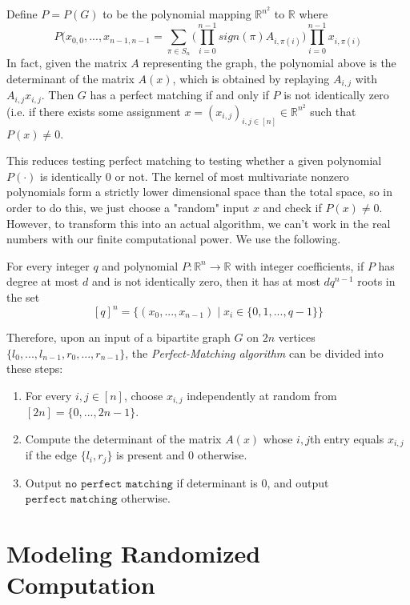 \documentclass{article}
\begin{document}
  \begin{lemma}
  Define $P = P(G)$ to be the polynomial mapping $\mathbb{R}^{n^2}$ to $\mathbb{R}$ where 
  \[P(x_{0, 0}, ..., x_{n-1, n-1} = \sum_{\pi \in S_n} \bigg( \prod_{i=0}^{n-1} sign(\pi) A_{i, \pi(i)} \bigg) \prod_{i=0}^{n-1} x_{i, \pi(i)}\]
  In fact, given the matrix $A$ representing the graph, the polynomial above is the determinant of the matrix $A(x)$, which is obtained by replaying $A_{i, j}$ with $A_{i, j} x_{i, j}$. Then $G$ has a perfect matching if and only if $P$ is not identically zero (i.e. if there exists some assignment $x = (x_{i, j})_{i, j \in [n]} \in \mathbb{R}^{n^2}$ such that $P(x) \neq 0$. 
  \end{lemma}
  This reduces testing perfect matching to testing whether a given polynomial $P(\cdot)$ is identically $0$ or not. The kernel of most multivariate nonzero polynomials form a strictly lower dimensional space than the total space, so in order to do this, we just choose a "random" input $x$ and check if $P(x) \neq 0$. However, to transform this into an actual algorithm, we can't work in the real numbers with our finite computational power. We use the following. 

  \begin{theorem}
  For every integer $q$ and polynomial $P: \mathbb{R}^n \longrightarrow \mathbb{R}$ with integer coefficients, if $P$ has degree at most $d$ and is not identically zero, then it has at most $d q^{n-1}$ roots in the set 
  \[[q]^n = \big\{(x_0, ..., x_{n-1}) \;|\; x_i \in \{0, 1, ..., q-1\}\big\}\]
  \end{theorem}

  Therefore, upon an input of a bipartite graph $G$ on $2n$ vertices $\{l_0, ..., l_{n-1}, r_0, ..., r_{n-1}\}$, the \textit{Perfect-Matching algorithm} can be divided into these steps: 
  \begin{enumerate}
      \item For every $i, j \in [n]$, choose $x_{i, j}$ independently at random from $[2n] = \{0, ..., 2n-1\}$. 
      \item Compute the determinant of the matrix $A(x)$ whose $i, j$th entry equals $x_{i, j}$ if the edge $\{l_i, r_j\}$ is present and $0$ otherwise. 
      \item Output $\texttt{no perfect matching}$ if determinant is $0$, and output $\texttt{perfect matching}$ otherwise. 
  \end{enumerate}

\section{Modeling Randomized Computation}
\end{document}
